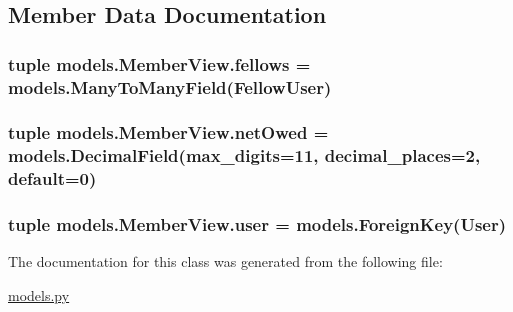 \subsection{Member Data Documentation}
\hypertarget{classmodels_1_1_member_view_a021cf8a6e0c3a9fe4d7595fecf7d9d6d}{
\subsubsection[{fellows}]{\setlength{\rightskip}{0pt plus 5cm}tuple models.\-Member\-View.\-fellows = models.\-Many\-To\-Many\-Field({\bf Fellow\-User})\hspace{0.3cm}{\ttfamily [static]}}}\label{classmodels_1_1_member_view_a021cf8a6e0c3a9fe4d7595fecf7d9d6d}
\hypertarget{classmodels_1_1_member_view_ad008581ab482be3c68ab8b40abfd0fb4}{
\subsubsection[{net\-Owed}]{\setlength{\rightskip}{0pt plus 5cm}tuple models.\-Member\-View.\-net\-Owed = models.\-Decimal\-Field(max\-\_\-digits=11, decimal\-\_\-places=2, default=0)\hspace{0.3cm}{\ttfamily [static]}}}\label{classmodels_1_1_member_view_ad008581ab482be3c68ab8b40abfd0fb4}
\hypertarget{classmodels_1_1_member_view_abb93f3b6aa9cac36c799e0efa49783ff}{
\subsubsection[{user}]{\setlength{\rightskip}{0pt plus 5cm}tuple models.\-Member\-View.\-user = models.\-Foreign\-Key(User)\hspace{0.3cm}{\ttfamily [static]}}}\label{classmodels_1_1_member_view_abb93f3b6aa9cac36c799e0efa49783ff}


The documentation for this class was generated from the following file\-:\begin{DoxyCompactItemize}
\item 
\hyperlink{models_8py}{models.\-py}\end{DoxyCompactItemize}
